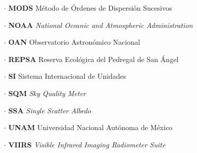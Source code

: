 \begin{itemize}
\item[$\cdot$] \textbf{MODS} Método de Órdenes de Dispersión Sucesivos

\item[$\cdot$] \textbf{NOAA} \textit{National Oceanic and Atmospheric Administration}

\item[$\cdot$] \textbf{OAN} Observatorio Astronómico Nacional

\item[$\cdot$] \textbf{REPSA} Reserva Ecológica del Pedregal de San Ángel

\item[$\cdot$] \textbf{SI} Sistema Internacional de Unidades

\item[$\cdot$] \textbf{SQM} \textit{Sky Quality Meter}

\item[$\cdot$] \textbf{SSA} \textit{Single Scatter Albedo}

\item[$\cdot$] \textbf{UNAM} Universidad Nacional Autónoma de México

\item[$\cdot$] \textbf{VIIRS} \textit{Visible Infrared Imaging Radiometer Suite}
			
\end{itemize}